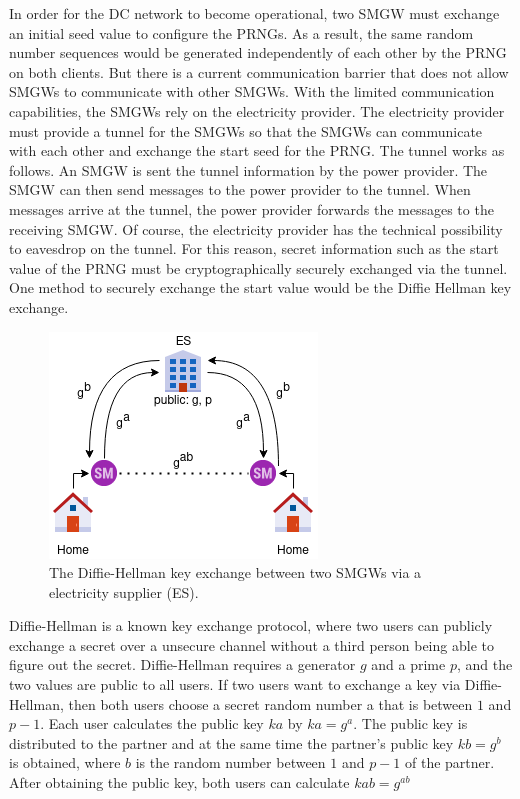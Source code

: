 In order for the DC network to become operational, two SMGW must exchange an initial seed value to configure the PRNGs. %
As a result, the same random number sequences would be generated independently of each other by the PRNG on both clients. But there is a current communication barrier that does not allow SMGWs to communicate with other SMGWs. With the limited communication capabilities, the SMGWs rely on the electricity provider. The electricity provider must provide a tunnel for the SMGWs so that the SMGWs can communicate with each other and exchange the start seed for the PRNG. The tunnel works as follows. An SMGW is sent the tunnel information by the power provider. The SMGW can then send messages to the power provider to the tunnel. When messages arrive at the tunnel, the power provider forwards the messages to the receiving SMGW. Of course, the electricity provider has the technical possibility to eavesdrop on the tunnel. For this reason, secret information such as the start value of the PRNG must be cryptographically securely exchanged via the tunnel. One method to securely exchange the start value would be the Diffie Hellman key exchange.\\
\begin{figure}[tbp]
  \centering
  \includegraphics[scale=0.7]{images/key_exchange.png}
  \caption[Diffie-Hellman Key Exchange in TR-03109]{The Diffie-Hellman key exchange between two SMGWs via a electricity supplier (ES).}
  \label{fig:keyexchange}
\end{figure}
Diffie-Hellman is a known key exchange protocol, where two users can publicly exchange a secret over a unsecure channel without a third person being able to figure out the secret. 
Diffie-Hellman requires a generator $g$ and a prime $p$, and the two values are public to all users. If two users want to exchange a key via Diffie-Hellman, then both users choose a secret random number a that is between $1$ and $p-1$. Each user calculates the public key $ka$ by $ka=g^a$. The public key is distributed to the partner and at the same time the partner's public key $kb=g^b$ is obtained, where $b$ is the random number between $1$ and $p-1$ of the partner. After obtaining the public key, both users can calculate $kab=g^{ab}$%
